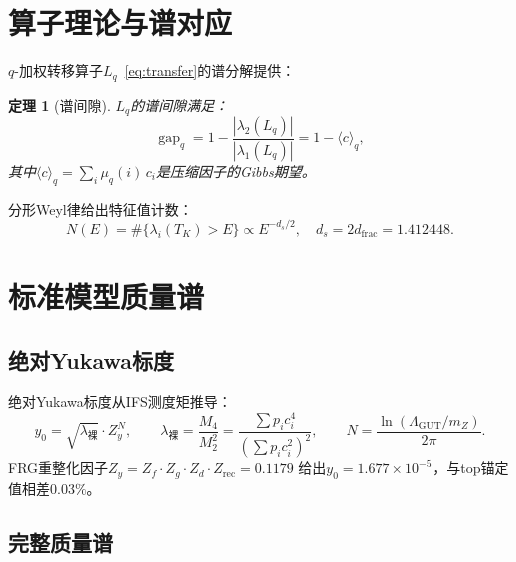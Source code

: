 \documentclass[12pt,a4paper]{ctexart}
\newtheorem{theorem}{定理}[section]
\newcommand{\gap}{\operatorname{gap}}
\begin{document}
\section{算子理论与谱对应}
\label{sec:operator}

$q$-加权转移算子$L_q$~\eqref{eq:transfer}的谱分解提供：

\begin{theorem}[谱间隙]
$L_q$的谱间隙满足：
\begin{equation}
\gap_q = 1 - \frac{|\lambda_2(L_q)|}{|\lambda_1(L_q)|} = 1 - \langle c \rangle_q,
\end{equation}
其中$\langle c \rangle_q = \sum_i \mu_q(i) \, c_i$是压缩因子的Gibbs期望。
\end{theorem}

分形Weyl律给出特征值计数：
\begin{equation}
N(E) = \#\{\lambda_i(T_K) > E\} \propto E^{-d_s/2},\quad d_s = 2d_{\text{frac}} = 1.412448.
\end{equation}

\section{标准模型质量谱}
\label{sec:masses}

\subsection{绝对Yukawa标度}

绝对Yukawa标度从IFS测度矩推导：
\begin{equation}
y_0 = \sqrt{\lambda_{\text{裸}}} \cdot Z_y^N,
\qquad 
\lambda_{\text{裸}} = \frac{M_4}{M_2^2} = \frac{\sum p_i c_i^4}{(\sum p_i c_i^2)^2},
\qquad 
N = \frac{\ln(\Lambda_{\text{GUT}}/m_Z)}{2\pi}.
\end{equation}
FRG重整化因子$Z_y = Z_f \cdot Z_g \cdot Z_d \cdot Z_{\text{rec}} = 0.1179$
给出$y_0 = 1.677 \times 10^{-5}$，与top锚定值相差$0.03\%$。

\subsection{完整质量谱}
\end{document}
